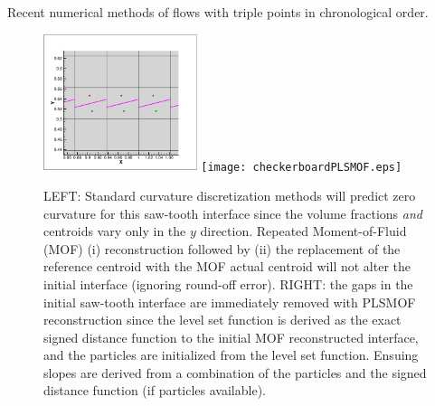 \documentclass[]{article}
\begin{document}
\begin{table}[htbp]
\caption{Recent numerical methods of flows with triple points in 
  chronological order.  \label{tab:triple_point} }
\end{table}

\begin{figure}[htbp]
\centering
\includegraphics[width=0.4\textwidth]{checkerboardMOF.eps}
\texttt{[image: checkerboardPLSMOF.eps]}
\caption{LEFT:
 Standard curvature discretization methods 
 \cite{sussman2003second,cummins2005estimating,REMMERSWAAL2022111473}
 will predict zero curvature for this saw-tooth
 interface since the volume fractions {\em and} 
 centroids vary only
 in the $y$ direction.  Repeated Moment-of-Fluid (MOF)
 (i) reconstruction followed by (ii) the replacement of the reference
 centroid with the MOF actual centroid will not alter the initial interface
 (ignoring round-off error).  RIGHT: the gaps in the initial saw-tooth 
 interface are immediately removed with PLSMOF reconstruction since the
 level set function is derived as the exact signed distance function to the
 initial MOF reconstructed interface, and the particles are initialized from
 the level set function.  Ensuing slopes
 are derived from a combination of the particles and the signed
 distance function (if particles available).
 \label{checkerboard} }
\end{figure}
\end{document}
